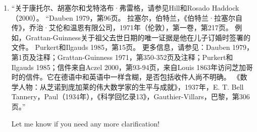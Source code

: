 \begin{enumerate}
\item “关于康托尔、胡塞尔和戈特洛布·弗雷格，请参见Hill和Rosado Haddock（2000）。  
“Dauben 1979，第96页。  
拉塞尔，伯特兰，《伯特兰·拉塞尔自传》，乔治·艾伦和温恩有限公司，1971年（伦敦），第一卷，第217页。  
例如，Grattan-Guinness关于祖父去世日期的唯一证据是他在儿子订婚时签署的文件。  
Purkert和Ilgauds 1985，第15页。  
更多信息，请参见：Dauben 1979，第1页及注释；Grattan-Guinness 1971，第350-352页及注释；Purkert和Ilgauds 1985；信件来自Aczel 2000，第93-94页，来自Louis 1863年访问芝加哥时的信件。它在德语中和英语中一样含糊，是否包括收件人尚不明确。  
《数学人物：从芝诺到庞加莱的伟大数学家的生平与成就》，1937年，E. T. Bell  
Tannery，Paul（1934年），《科学回忆录13》，Gauthier-Villars，巴黎，第306页。”

Let me know if you need any more clarification!

\end{enumerate}
